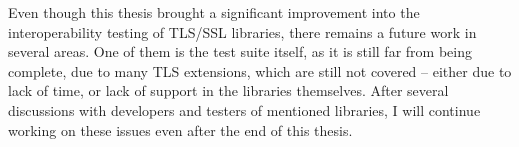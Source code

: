     Even though this thesis brought a significant improvement into the
    interoperability testing of TLS/SSL libraries, there remains a future
    work in several areas. One of them is
    the test suite itself, as it is still far from being complete, due to many
    TLS extensions, which are still not covered -- either due to lack of time,
    or lack of support in the libraries themselves. After several discussions
    with developers and testers of mentioned libraries, I will continue working
    on these issues even after the end of this thesis.


